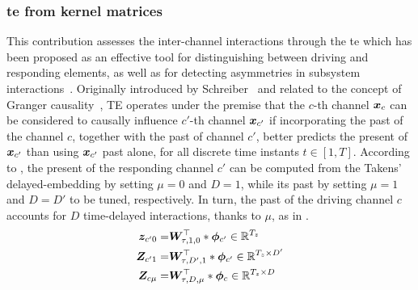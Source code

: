 \subsubsection{\gls{te}  from kernel matrices}

{This contribution} assesses the inter-channel interactions through the \gls{te}  which has been proposed as an effective tool for distinguishing between driving and responding elements, as well as for detecting asymmetries in subsystem interactions~\cite{staniek2008symbolic}. Originally introduced by Schreiber~\cite{schreiber2000measuring} and related to the concept of Granger causality~\cite{Sethgranger}, TE operates under the premise that the $c$-th channel ${\bm{x}}_{c}$ can be considered to causally influence $c'$-th channel ${\bm{x}}_{c'}$ if incorporating the past of the channel $c$, together with the past of channel $c'$, better predicts the present of ${\bm{x}}_{c'}$ than using ${\bm{x}}_{c'}$ past alone, for all discrete time instants $t\in[1,T]$. According to , the present of the responding channel $c'$ can be computed from the Takens' delayed-embedding by setting $\mu=0$ and $D=1$, while its past by setting $\mu=1$ and $D=D'$ to be tuned, respectively. In turn, the past of the driving channel $c$ accounts for $D$ time-delayed interactions, thanks to $\mu$, as in .
\begin{align}
{\bm{z}}_{c'0}=&{\bm{W}}_{\tau,1,0}^\top*{\bm{\phi}}_{c'}\in\mathbb{R}^{T_z}\label{eq:yt}\\
{\bm{Z}}_{c'1}=&{\bm{W}}_{\tau,D',1}^\top*{\bm{\phi}}_{c'}\in\mathbb{R}^{T_z\times D'}\label{eq:yt-1}\\
{\bm{Z}}_{c\mu}=&{\bm{W}}_{\tau,D,\mu}^\top*{\bm{\phi}}_c\in\mathbb{R}^{T_z\times D}\label{eq:xt-u}
\end{align}

